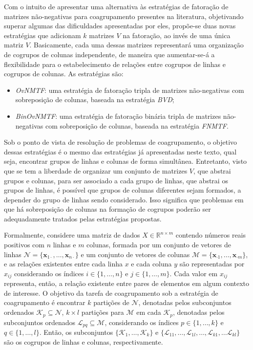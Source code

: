 \documentclass[
    12pt,                %
    oneside,            %
    a4paper,            %
    english,            %
    brazil                %
    ]{abntex2ppgsi}
\begin{document}
Com o intuito de apresentar uma alternativa às estratégias de fatoração de matrizes não-negativas para coagrupamento presentes na literatura, objetivando superar algumas das dificuldades apresentadas por eles, propõe-se duas novas estratégias que adicionam $k$ matrizes $V$ na fatoração, ao invés de uma única matriz $V$.
Basicamente, cada uma dessas matrizes representará uma organização de cogrupos de colunas independente, de maneira que aumentar-se-á a flexibilidade para o estabelecimento de relações entre cogrupos de linhas e cogrupos de colunas.
As estratégias são:

\begin{itemize}
\item \textit{OvNMTF}: uma estratégia de fatoração tripla de matrizes não-negativas com sobreposição de colunas, baseada na estratégia \textit{BVD};
\item \textit{BinOvNMTF}: uma estratégia de fatoração binária tripla de matrizes não-negativas com sobreposição de colunas, baseada na estratégia \textit{FNMTF}.
\end{itemize}

Sob o ponto de vista de resolução de problemas de coagrupamento, o objetivo dessas estratégias é o mesmo das estratégias já apresentadas neste texto, qual seja, encontrar grupos de linhas e colunas de forma simultânea.
Entretanto, visto que se tem a liberdade de organizar um conjunto de matrizes $V$, que abstrai grupos e colunas, para ser associado a cada grupo de linhas, que abstrai os grupos de linhas, é possível que grupos de colunas diferentes sejam formados, a depender do grupo de linhas sendo considerado.
Isso significa que problemas em que há sobreposição de colunas na formação de cogrupos poderão ser adequadamente tratados pelas estratégias propostas.

Formalmente, considere uma matriz de dados $X \in \mathbb{R}^{n \times m}$ contendo números reais positivos com $n$ linhas e $m$ colunas, formada por um conjunto de vetores de linhas $\mathcal{N} = \{ \mathbf{x}_{1 \cdot}, \dots, \mathbf{x}_{n \cdot} \}$ e um conjunto de vetores de colunas $\mathcal{M} = \{ \mathbf{x}_{\cdot 1}, \dots, \mathbf{x}_{\cdot m} \}$, e as relações existentes entre cada linha $x$ e cada coluna $y$ são representadas por $x_{ij}$ considerando os índices $i \in \{1, \dots, n\}$ e $j \in \{1, \dots, m\}$.
Cada valor em $x_{ij}$ representa, então, a relação existente entre pares de elementos em algum contexto de interesse.
O objetivo da tarefa de coagrupamento sob a estratégia de coagrupamento é encontrar $k$ partições de $\mathcal{N}$, denotadas pelos subconjuntos ordenados $\mathcal{K}_p \subseteq \mathcal{N}$, $k \times l$ partições para $\mathcal{M}$ em cada $\mathcal{K}_p$, denotadas pelos subconjuntos ordenados $\mathcal{L}_{pq} \subseteq \mathcal{M}$, considerando os índices $p \in \{ 1, \dots, k\}$ e $q \in \{1, \dots, l\}$.
Então, os subconjuntos $\{\mathcal{K}_1, \dots, \mathcal{K}_k\}$ e $\{\mathcal{L}_{11}, \dots, \mathcal{L}_{1l}, \dots, \mathcal{L}_{k1}, \dots \mathcal{L}_{kl}\}$ são os cogrupos de linhas e colunas, respectivamente.
\end{document}
